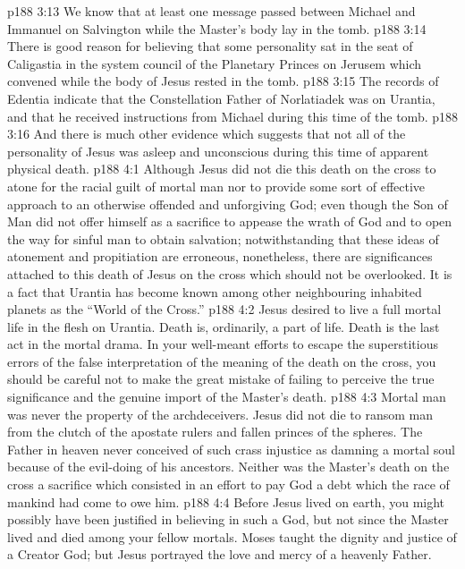 \vs p188 3:13 We know that at least one message passed between Michael and Immanuel on Salvington while the Master’s body lay in the tomb.
\vs p188 3:14 There is good reason for believing that some personality sat in the seat of Caligastia in the system council of the Planetary Princes on Jerusem which convened while the body of Jesus rested in the tomb.
\vs p188 3:15 The records of Edentia indicate that the Constellation Father of Norlatiadek was on Urantia, and that he received instructions from Michael during this time of the tomb.
\vs p188 3:16 And there is much other evidence which suggests that not all of the personality of Jesus was asleep and unconscious during this time of apparent physical death.
\vs p188 4:1 Although Jesus did not die this death on the cross to atone for the racial guilt of mortal man nor to provide some sort of effective approach to an otherwise offended and unforgiving God; even though the Son of Man did not offer himself as a sacrifice to appease the wrath of God and to open the way for sinful man to obtain salvation; notwithstanding that these ideas of atonement and propitiation are erroneous, nonetheless, there are significances attached to this death of Jesus on the cross which should not be overlooked. It is a fact that Urantia has become known among other neighbouring inhabited planets as the “World of the Cross.”
\vs p188 4:2 Jesus desired to live a full mortal life in the flesh on Urantia. Death is, ordinarily, a part of life. Death is the last act in the mortal drama. In your well\hyp{}meant efforts to escape the superstitious errors of the false interpretation of the meaning of the death on the cross, you should be careful not to make the great mistake of failing to perceive the true significance and the genuine import of the Master’s death.
\vs p188 4:3 \pc Mortal man was never the property of the archdeceivers. Jesus did not die to ransom man from the clutch of the apostate rulers and fallen princes of the spheres. The Father in heaven never conceived of such crass injustice as damning a mortal soul because of the evil\hyp{}doing of his ancestors. Neither was the Master’s death on the cross a sacrifice which consisted in an effort to pay God a debt which the race of mankind had come to owe him.
\vs p188 4:4 Before Jesus lived on earth, you might possibly have been justified in believing in such a God, but not since the Master lived and died among your fellow mortals. Moses taught the dignity and justice of a Creator God; but Jesus portrayed the love and mercy of a heavenly Father.
